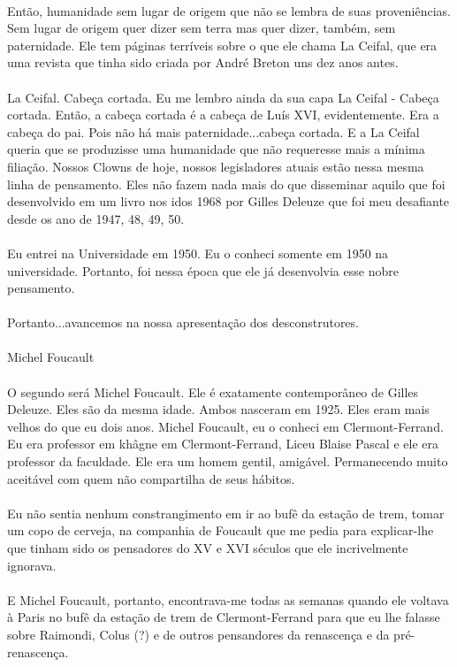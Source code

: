 \documentclass[10pt,a4paper]{book}
\begin{document}
	\\
	Então, humanidade sem lugar de origem que não se lembra de suas proveniências. Sem lugar de origem quer dizer sem terra mas quer dizer, também, sem paternidade. Ele tem páginas terríveis sobre o que ele chama La Ceifal, que era uma revista que tinha sido criada por André Breton uns dez anos antes. \\
	\\
	La Ceifal. Cabeça cortada. Eu me lembro ainda da sua capa La Ceifal  - Cabeça cortada. Então, a cabeça cortada é a cabeça de Luís XVI, evidentemente. Era a cabeça do pai. Pois não há mais paternidade...cabeça cortada. E a La Ceifal queria que se produzisse uma humanidade que não requeresse mais a mínima filiação. Nossos Clowns de hoje, nossos legisladores atuais estão nessa mesma linha de pensamento. Eles não fazem nada mais do que disseminar aquilo que foi desenvolvido em um livro nos idos 1968 por Gilles Deleuze que foi meu desafiante desde os ano de 1947, 48, 49, 50.\\
	\\
	Eu entrei na Universidade em 1950. Eu o conheci somente em 1950 na universidade. Portanto, foi nessa época que ele já desenvolvia esse nobre pensamento. \\
	\\
	Portanto...avancemos na nossa apresentação dos desconstrutores.\\
	\\
	Michel Foucault\\
	\\
	O segundo será Michel Foucault. Ele é exatamente contemporâneo de Gilles Deleuze. Eles são da mesma idade. Ambos nasceram em 1925. Eles eram mais velhos do que eu dois anos. Michel Foucault, eu o conheci em Clermont-Ferrand. Eu era professor em khâgne em Clermont-Ferrand, Liceu Blaise Pascal e ele era professor da faculdade. Ele era um homem gentil, amigável. Permanecendo muito aceitável com quem não compartilha de seus hábitos.\\
	\\
	Eu não sentia nenhum constrangimento em ir ao bufê da estação de trem, tomar um copo de cerveja, na companhia de Foucault que me pedia para explicar-lhe que tinham sido os pensadores do XV e XVI séculos que ele incrivelmente ignorava.\\
	\\
	E Michel Foucault, portanto, encontrava-me todas as semanas quando ele voltava à Paris no bufê da estação de trem de Clermont-Ferrand para que eu lhe falasse sobre Raimondi, Colus (?) e de outros pensandores da renascença e da pré-renascença.\\
\end{document}

